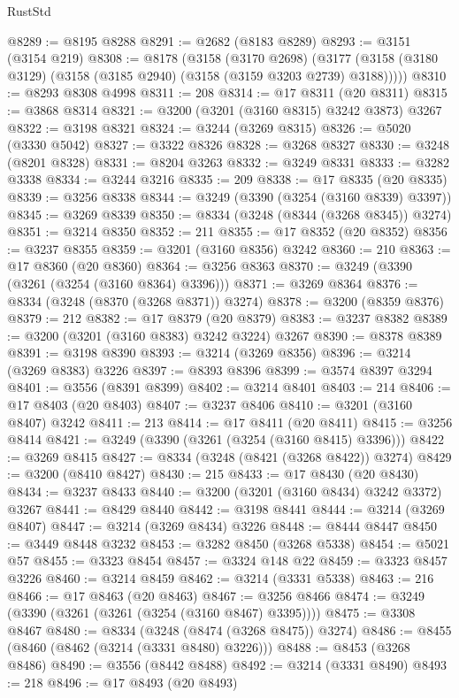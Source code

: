 \begin{lexlean}{RustStd}
\begin{coremodule}
{\begin{coremodule}
{{{{{{{{{{{{{{{{{{{{{{{{{@8289 := @8195 @8288
@8291 := @2682 (@8183 @8289)
@8293 := @3151 (@3154 @219)
@8308 := @8178
    (@3158
      (@3170 @2698)
      (@3177 (@3158 (@3180 @3129) (@3158 (@3185 @2940) (@3158 (@3159 @3203 @2739) @3188)))))
@8310 := @8293 @8308 @4998
@8311 := 208
@8314 := @17 @8311 (@20 @8311)
@8315 := @3868 @8314
@8321 := @3200 (@3201 (@3160 @8315) @3242 @3873) @3267
@8322 := @3198 @8321
@8324 := @3244 (@3269 @8315)
@8326 := @5020 (@3330 @5042)
@8327 := @3322 @8326
@8328 := @3268 @8327
@8330 := @3248 (@8201 @8328)
@8331 := @8204 @3263
@8332 := @3249 @8331
@8333 := @3282 @3338
@8334 := @3244 @3216
@8335 := 209
@8338 := @17 @8335 (@20 @8335)
@8339 := @3256 @8338
@8344 := @3249 (@3390 (@3254 (@3160 @8339) @3397))
@8345 := @3269 @8339
@8350 := @8334 (@3248 (@8344 (@3268 @8345)) @3274)
@8351 := @3214 @8350
@8352 := 211
@8355 := @17 @8352 (@20 @8352)
@8356 := @3237 @8355
@8359 := @3201 (@3160 @8356) @3242
@8360 := 210
@8363 := @17 @8360 (@20 @8360)
@8364 := @3256 @8363
@8370 := @3249 (@3390 (@3261 (@3254 (@3160 @8364) @3396)))
@8371 := @3269 @8364
@8376 := @8334 (@3248 (@8370 (@3268 @8371)) @3274)
@8378 := @3200 (@8359 @8376)
@8379 := 212
@8382 := @17 @8379 (@20 @8379)
@8383 := @3237 @8382
@8389 := @3200 (@3201 (@3160 @8383) @3242 @3224) @3267
@8390 := @8378 @8389
@8391 := @3198 @8390
@8393 := @3214 (@3269 @8356)
@8396 := @3214 (@3269 @8383) @3226
@8397 := @8393 @8396
@8399 := @3574 @8397 @3294
@8401 := @3556 (@8391 @8399)
@8402 := @3214 @8401
@8403 := 214
@8406 := @17 @8403 (@20 @8403)
@8407 := @3237 @8406
@8410 := @3201 (@3160 @8407) @3242
@8411 := 213
@8414 := @17 @8411 (@20 @8411)
@8415 := @3256 @8414
@8421 := @3249 (@3390 (@3261 (@3254 (@3160 @8415) @3396)))
@8422 := @3269 @8415
@8427 := @8334 (@3248 (@8421 (@3268 @8422)) @3274)
@8429 := @3200 (@8410 @8427)
@8430 := 215
@8433 := @17 @8430 (@20 @8430)
@8434 := @3237 @8433
@8440 := @3200 (@3201 (@3160 @8434) @3242 @3372) @3267
@8441 := @8429 @8440
@8442 := @3198 @8441
@8444 := @3214 (@3269 @8407)
@8447 := @3214 (@3269 @8434) @3226
@8448 := @8444 @8447
@8450 := @3449 @8448 @3232
@8453 := @3282 @8450 (@3268 @5338)
@8454 := @5021 @57
@8455 := @3323 @8454
@8457 := @3324 @148 @22
@8459 := @3323 @8457 @3226
@8460 := @3214 @8459
@8462 := @3214 (@3331 @5338)
@8463 := 216
@8466 := @17 @8463 (@20 @8463)
@8467 := @3256 @8466
@8474 := @3249 (@3390 (@3261 (@3261 (@3254 (@3160 @8467) @3395))))
@8475 := @3308 @8467
@8480 := @8334 (@3248 (@8474 (@3268 @8475)) @3274)
@8486 := @8455 (@8460 (@8462 (@3214 (@3331 @8480) @3226)))
@8488 := @8453 (@3268 @8486)
@8490 := @3556 (@8442 @8488)
@8492 := @3214 (@3331 @8490)
@8493 := 218
@8496 := @17 @8493 (@20 @8493)
}}}}}}}}}}}}}}}}}}}}}}}}}
\end{coremodule}}
\end{coremodule}
\end{lexlean}
